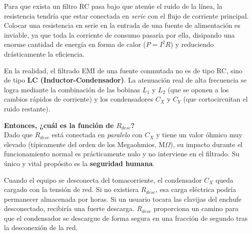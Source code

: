 \documentclass[12pt, a4paper]{article}
\begin{document}
Para que exista un filtro RC pasa bajo que atenúe el ruido de la línea, la resistencia tendría que estar conectada en \textit{serie} con el flujo de corriente principal. Colocar una resistencia en serie en la entrada de una fuente de alimentación es inviable, ya que toda la corriente de consumo pasaría por ella, disipando una enorme cantidad de energía en forma de calor ($P = I^2R$) y reduciendo drásticamente la eficiencia.

En la realidad, el filtrado EMI de una fuente conmutada no es de tipo RC, sino de tipo \textbf{LC (Inductor-Condensador)}. La atenuación real de alta frecuencia se logra mediante la combinación de las bobinas $L_1$ y $L_2$ (que se oponen a los cambios rápidos de corriente) y los condensadores $C_X$ y $C_{Y}$ (que cortocircuitan el ruido restante).

\textbf{Entonces, ¿cuál es la función de $R_{desc}$?} \\
Dado que $R_{desc}$ está conectada en \textit{paralelo} con $C_X$ y tiene un valor óhmico muy elevado (típicamente del orden de los Megaohmios, $\text{M}\Omega$), su impacto durante el funcionamiento normal es prácticamente nulo y no interviene en el filtrado. Su único y vital propósito es la \textbf{seguridad humana}. 

Cuando el equipo se desconecta del tomacorriente, el condensador $C_X$ queda cargado con la tensión de red. Si no existiera $R_{desc}$, esa carga eléctrica podría permanecer almacenada por horas. Si un usuario tocara las clavijas del enchufe desconectado, recibiría una fuerte descarga. $R_{desc}$ proporciona un camino para que el condensador se descargue de forma segura en una fracción de segundo tras la desconexión de la red.
\end{document}
